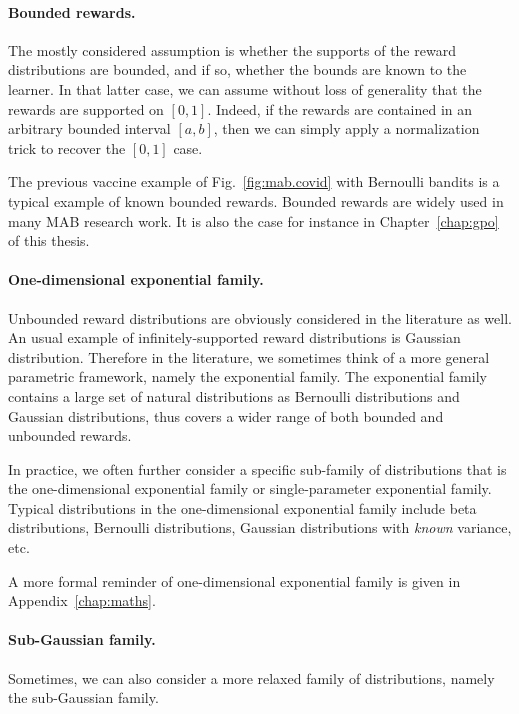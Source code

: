 \paragraph{Bounded rewards.}

The mostly considered assumption is whether the supports of the reward distributions are bounded, and if so, whether the bounds are known to the learner. In that latter case, we can assume without loss of generality that the rewards are supported on $[0,1]$. Indeed, if the rewards are contained in an arbitrary bounded interval $[a,b]$, then we can simply apply a normalization trick to recover the $[0,1]$ case.

The previous vaccine example of Fig.~\ref{fig:mab.covid} with Bernoulli bandits is a typical example of known bounded rewards. Bounded rewards are widely used in many MAB research work. It is also the case for instance in Chapter~\ref{chap:gpo} of this thesis.

\paragraph{One-dimensional exponential family.}

Unbounded reward distributions are obviously considered in the literature as well. An usual example of infinitely-supported reward distributions is Gaussian distribution. Therefore in the literature, we sometimes think of a more general parametric framework, namely the exponential family. The exponential family contains a large set of natural distributions as Bernoulli distributions and Gaussian distributions, thus covers a wider range of both bounded and unbounded rewards.

In practice, we often further consider a specific sub-family of distributions that is the \gls{one-dimensional exponential family} or \gls{single-parameter exponential family}. Typical distributions in the one-dimensional exponential family include beta distributions, Bernoulli distributions, Gaussian distributions with \emph{known} variance, etc.

A more formal reminder of one-dimensional exponential family is given in Appendix~\ref{chap:maths}.

\paragraph{Sub-Gaussian family.}

Sometimes, we can also consider a more relaxed family of distributions, namely the sub-Gaussian family.

